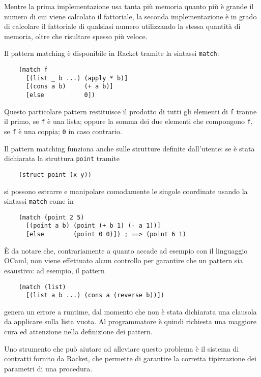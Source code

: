 Mentre la prima implementazione usa tanta pi\`u memoria quanto pi\`u \`e
grande il numero di cui viene calcolato il fattoriale, la seconda
implementazione \`e in grado di calcolare il fattoriale di qualsiasi
numero utilizzando la stessa quantit\`a di memoria, oltre che risultare
spesso pi\`u veloce.

Il pattern matching \`e disponibile in Racket tramite la sintassi
\lstinline{match}:

\begin{lstlisting}
    (match f
      [(list _ b ...) (apply * b)]
      [(cons a b)     (+ a b)]
      [else           0])
\end{lstlisting}

Questo particolare pattern restituisce il prodotto di tutti gli elementi
di \lstinline{f} tranne il primo, se \lstinline{f} \`e una lista; oppure
la somma dei due elementi che compongono \lstinline{f}, se \lstinline{f}
\`e una coppia; \lstinline{0} in caso contrario.

Il pattern matching funziona anche sulle strutture definite dall'utente:
se \`e stata dichiarata la struttura \lstinline{point} tramite

\begin{lstlisting}
    (struct point (x y))
\end{lstlisting}

si possono estrarre e manipolare comodamente le singole coordinate usando
la sintassi \lstinline{match} come in

\begin{lstlisting}
    (match (point 2 5)
      [(point a b) (point (+ b 1) (- a 1))]
      [else        (point 0 0)]) ; ==> (point 6 1)
\end{lstlisting}

\`E da notare che, contrariamente a quanto accade ad esempio con il
linguaggio OCaml, non viene effettuato alcun controllo per garantire che
un pattern sia esaustivo: ad esempio, il pattern

\begin{lstlisting}
    (match (list)
      [(list a b ...) (cons a (reverse b))])
\end{lstlisting}

genera un errore a runtime, dal momento che non \`e stata dichiarata una
clausola da applicare sulla lista vuota. Al programmatore \`e quindi
richiesta una maggiore cura ed attenzione nella definizione dei pattern.

Uno strumento che pu\`o aiutare ad alleviare questo problema \`e il
sistema di contratti fornito da Racket, che permette di garantire la
corretta tipizzazione dei parametri di una procedura.

